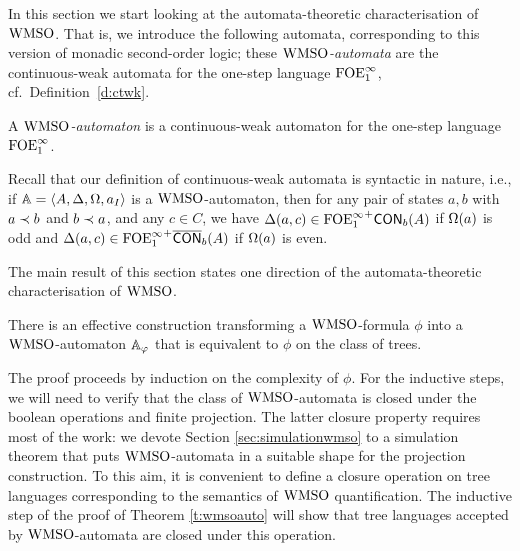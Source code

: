 
In this section we start looking at the automata-theoretic characterisation of 
$\mathrm{WMSO}$.
That is, we introduce the following automata, corresponding to this version of 
monadic second-order logic; these \emph{$\mathrm{WMSO}$-automata} are the continuous-weak
automata for the one-step language $\mathrm{FOE}^{\infty}_1$, cf.~Definition~\ref{d:ctwk}.

\begin{definition}
A \emph{$\mathrm{WMSO}$-automaton} is a continuous-weak automaton for the one-step 
language $\mathrm{FOE}^{\infty}_1$.
\end{definition}

Recall that our definition of continuous-weak automata is syntactic in nature,
i.e., if $\mathbb{A} = \langle{A,\Delta,\Omega,a_I}\rangle$ is a $\mathrm{WMSO}$-automaton, then for any 
pair of states $a,b$ with $a \prec b$ and $b \prec a$, and any $c\in C$, we have
$\Delta(a,c) \in {\ensuremath{\mathrm{FOE}^{\infty}_1}}^+\mathsf{CON}_{b}(A)$ if $\Omega(a)$ is odd and $\Delta(a,c) 
\in {\ensuremath{\mathrm{FOE}^{\infty}_1}}^+\overline{\mathsf{CON}}_{b}(A)$ if $\Omega(a)$ is even.

The main result of this section states one direction of the automata-theoretic
characterisation of $\mathrm{WMSO}$.

\begin{theorem}
\label{t:wmsoauto}
There is an effective construction transforming a $\mathrm{WMSO}$-formula $\phi$
into a $\mathrm{WMSO}$-automaton $\mathbb{A}_{\varphi}$ that is equivalent
to $\phi$ on the class of trees.
\end{theorem}

The proof proceeds by induction on the complexity of
$\phi$. For the inductive steps, we will need to verify that the class of
$\mathrm{WMSO}$-automata is closed under the boolean operations and finite projection.
The latter closure property requires most of the work: we devote 
Section \ref{sec:simulationwmso} to a simulation theorem that puts
$\mathrm{WMSO}$-automata in a suitable shape for the projection construction.
%
To this aim, it is convenient to define a closure operation on tree languages 
corresponding to the semantics of $\mathrm{WMSO}$ quantification. 
The inductive step of the proof of Theorem \ref{t:wmsoauto} will show that tree
languages accepted by $\mathrm{WMSO}$-automata are closed under this operation.

